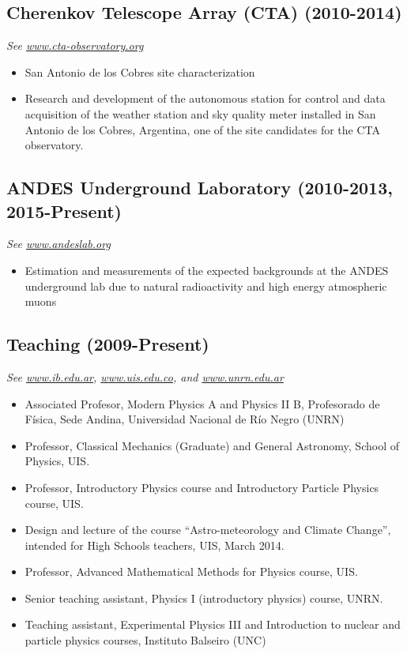 \subsection*{Cherenkov Telescope Array (CTA) (2010-2014)}
{\small{\textit{See \href{http://www.cta-observatory.org}{www.cta-observatory.org}}}}
\begin{itemize}
\item San Antonio de los Cobres site characterization
\item Research and development of the autonomous station for control and data
acquisition of the weather station and sky quality meter installed in San
Antonio de los Cobres, Argentina, one of the site candidates for the CTA
observatory.
\end{itemize}

\subsection*{ANDES Underground Laboratory (2010-2013, 2015-Present)}
{\small{\textit{See \href{http://www.andeslab.org}{www.andeslab.org}}}}
\begin{itemize}
\item Estimation and measurements of the expected backgrounds at the ANDES
underground lab due to natural radioactivity and high energy atmospheric muons
\end{itemize}

\subsection*{Teaching (2009-Present)}
{\small{\textit{See \href{http://www.ib.edu.ar}{www.ib.edu.ar}, \href{http://www.uis.edu.co}{www.uis.edu.co}, and \href{http://www.unrn.edu.ar}{www.unrn.edu.ar}}}}
\begin{itemize}
\item Associated Profesor, Modern Physics A and Physics II B, Profesorado de Física, Sede Andina, Universidad Nacional de Río Negro (UNRN)
\item Professor, Classical Mechanics (Graduate) and General Astronomy, School of Physics, UIS.
\item Professor, Introductory Physics course and Introductory Particle Physics course, UIS.
\item Design and lecture of the course ``Astro-meteorology and Climate Change'', intended for High Schools teachers, UIS, March 2014.
\item Professor, Advanced Mathematical Methods for Physics course, UIS.
\item Senior teaching assistant, Physics I (introductory physics) course, UNRN.
\item Teaching assistant, Experimental Physics III and Introduction to nuclear
and particle physics courses, Instituto Balseiro (UNC)
\end{itemize}
\else
